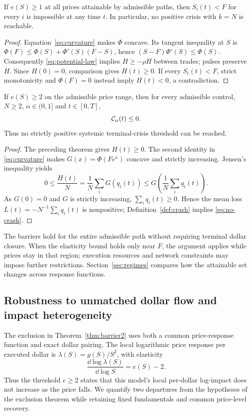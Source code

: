 \documentclass[review,hidelinks,onefignum,onetabnum]{siamonline250211}
\begin{document}
\begin{theorem}\label{thm:barrier1}
If $e(S)\ge1$ at all prices attainable by admissible paths, then $S_i(t)<F$ for every $i$ is impossible at any time $t$. In particular, no positive crisis with $k=N$ is reachable.
\end{theorem}
\begin{proof}
Equation~\eqref{eq:curvature} makes $\Phi$ concave. Its tangent inequality at $S$ is $\Phi(F)\le\Phi(S)+\Phi'(S)(F-S)$, hence $(S-F)\Phi'(S)\le\Phi(S)$. Consequently \eqref{eq:potential-law} implies $\dot H\ge-\rho H$ between trades; pulses preserve $H$. Since $H(0)=0$, comparison gives $H(t)\ge0$. If every $S_i(t)<F$, strict monotonicity and $\Phi(F)=0$ instead imply $H(t)<0$, a contradiction.
\end{proof}

\begin{theorem}\label{thm:barrier2}
If $e(S)\ge2$ on the admissible price range, then for every admissible control, $N\ge2$, $\alpha\in(0,1]$ and $t\in[0,T]$,
\begin{equation}\label{eq:no-crash}
\mathcal{C}_\alpha(t)\le0.
\end{equation}
Thus no strictly positive systemic terminal-crisis threshold can be reached.
\end{theorem}
\begin{proof}
The preceding theorem gives $H(t)\ge0$. The second identity in \eqref{eq:curvature} makes $G(x)=\Phi(Fe^x)$ concave and strictly increasing. Jensen's inequality yields
\[
0\le\frac{H(t)}N=\frac1N\sum_iG(q_i(t))
\le G\!\left(\frac1N\sum_iq_i(t)\right).
\]
As $G(0)=0$ and $G$ is strictly increasing, $\sum_iq_i(t)\ge0$. Hence the mean loss $\overline L(t)=-N^{-1}\sum_iq_i(t)$ is nonpositive; Definition~\ref{def:crash} implies \eqref{eq:no-crash}.
\end{proof}

The barriers hold for the entire admissible path without requiring terminal dollar closure. When the elasticity bound holds only near $F$, the argument applies while prices stay in that region; execution resources and network constraints may impose further restrictions. Section~\ref{sec:regimes} compares how the attainable set changes across response functions.

\subsection{Robustness to unmatched dollar flow and impact heterogeneity}
\label{subsec:barrier-robustness}
The exclusion in Theorem~\ref{thm:barrier2} uses both a common
price-response function and exact dollar pairing. The local logarithmic
price response per executed dollar is
$\lambda(S)=g(S)/S^2$, with elasticity
\[
\frac{\dd\log\lambda(S)}{\dd\log S}=e(S)-2.
\]
Thus the threshold $e\ge2$ states that this model's local
per-dollar log-impact does not increase as the price falls.
We quantify two departures from the hypotheses of the exclusion theorem
while retaining fixed fundamentals and common price-level recovery.
\end{document}
